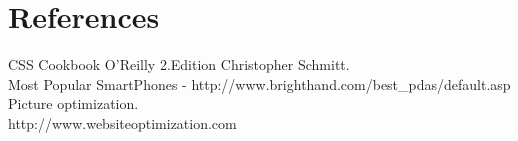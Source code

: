 \newpage
\section{References}
CSS Cookbook O'Reilly 2.Edition Christopher Schmitt. \\
Most Popular SmartPhones - http://www.brighthand.com/best\_pdas/default.asp \\
Picture optimization.\\
http://www.websiteoptimization.com\\

